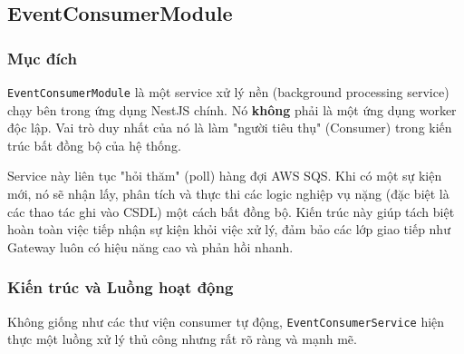 \subsection{EventConsumerModule}
\label{subsec:eventconsumer-module}

\subsubsection{Mục đích}

\texttt{EventConsumerModule} là một service xử lý nền (background processing service) chạy bên trong ứng dụng NestJS chính. Nó \textbf{không} phải là một ứng dụng worker độc lập. Vai trò duy nhất của nó là làm "người tiêu thụ" (Consumer) trong kiến trúc bất đồng bộ của hệ thống.

Service này liên tục "hỏi thăm" (poll) hàng đợi AWS SQS. Khi có một sự kiện mới, nó sẽ nhận lấy, phân tích và thực thi các logic nghiệp vụ nặng (đặc biệt là các thao tác ghi vào CSDL) một cách bất đồng bộ. Kiến trúc này giúp tách biệt hoàn toàn việc tiếp nhận sự kiện khỏi việc xử lý, đảm bảo các lớp giao tiếp như Gateway luôn có hiệu năng cao và phản hồi nhanh.

\subsubsection{Kiến trúc và Luồng hoạt động}

Không giống như các thư viện consumer tự động, \texttt{EventConsumerService} hiện thực một luồng xử lý thủ công nhưng rất rõ ràng và mạnh mẽ.

